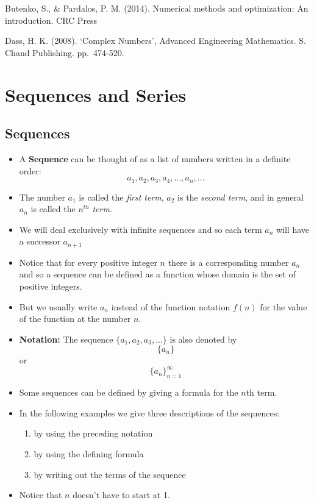 \documentclass[]{book}
\providecommand{\tightlist}{%
  \setlength{\itemsep}{0pt}\setlength{\parskip}{0pt}}
\begin{document}
Butenko, S., \& Pardalos, P. M. (2014). Numerical methods and optimization: An introduction. CRC Press

Dass, H. K. (2008). `Complex Numbers', Advanced Engineering Mathematics. S. Chand Publishing. pp.~474-520.

\hypertarget{sequences-and-series}{%
\chapter{Sequences and Series}\label{sequences-and-series}}

\hypertarget{sequences}{%
\section{Sequences}\label{sequences}}

\begin{itemize}
\tightlist
\item
  A \textbf{Sequence} can be thought of as a list of numbers written in a definite order:
  \[a_{1}, a_{2}, a_{3}, a_{4}, ..., a_{n}, ...\]
\item
  The number \(a_{1}\) is called the \emph{first term}, \(a_{2}\) is the \emph{second term}, and in general \(a_{n}\) is called the \(n^{th}\) \emph{term}.
\item
  We will deal exclusively with infinite sequences and so each term \(a_{n}\) will have a successor \(a_{n+1}\)
\item
  Notice that for every positive integer \(n\) there is a corresponding number \(a_{n}\) and so a sequence can be defined as a function whose domain is the set of positive integers.
\item
  But we usually write \(a_{n}\) instead of the function notation \(f(n)\) for the value of the function at the number \(n\).
\item
  \textbf{Notation:} The sequence \(\{a_{1}, a_{2}, a_{3},...\}\) is also denoted by
  \[\{a_{n}\}\] or \[\{a_{n}\}_{n=1}^{\infty}\]
\item
  Some sequences can be defined by giving a formula for the \(n\)th term.
\item
  In the following examples we give three descriptions of the sequences:

  \begin{enumerate}
  \def\labelenumi{\roman{enumi}.}
  \tightlist
  \item
    by using the preceding notation
  \item
    by using the defining formula
  \item
    by writing out the terms of the sequence
  \end{enumerate}
\item
  Notice that \(n\) doesn't have to start at 1.
\end{itemize}
\end{document}
